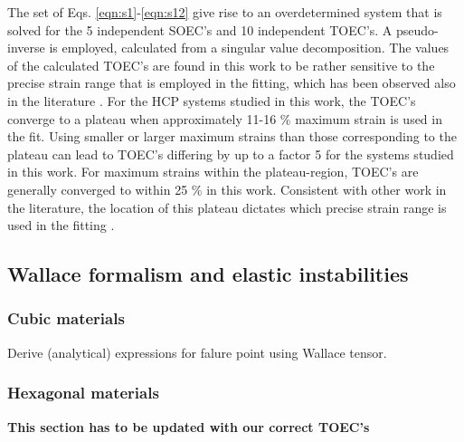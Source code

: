 \documentclass[showpacs,aps,floatfix,prb,reprint,superscriptaddress]{revtex4-1}
\begin{document}
The set of Eqs. \ref{eqn:s1}-\ref{eqn:s12} give rise to an overdetermined system that is solved for the 5 independent SOEC's and 10 independent TOEC's. A pseudo-inverse is employed, calculated from a singular value decomposition. The values of the calculated TOEC's are found in this work to be rather sensitive to the precise strain range that is employed in the fitting, which has been observed also in the literature \cite{wang2009ab,lopuszynski2007ab,wang2012nonlinear}. For the HCP systems studied in this work, the TOEC's converge to a plateau when approximately 11-16 \% maximum strain is used in the fit. Using smaller or larger maximum strains than those corresponding to the plateau can lead to TOEC's differing by up to a factor 5 for the systems studied in this work. For maximum strains within the plateau-region, TOEC's are generally converged to within 25 \% in this work. Consistent with other work in the literature, the location of this plateau dictates which precise strain range is used in the fitting \cite{wang2009ab,wang2012nonlinear}.




\subsection{Wallace formalism and elastic instabilities}
\subsubsection{Cubic materials}
Derive (analytical) expressions for falure point using Wallace tensor.

\subsubsection{Hexagonal materials}
\textbf{This section has to be updated with our correct TOEC's}
\end{document}
